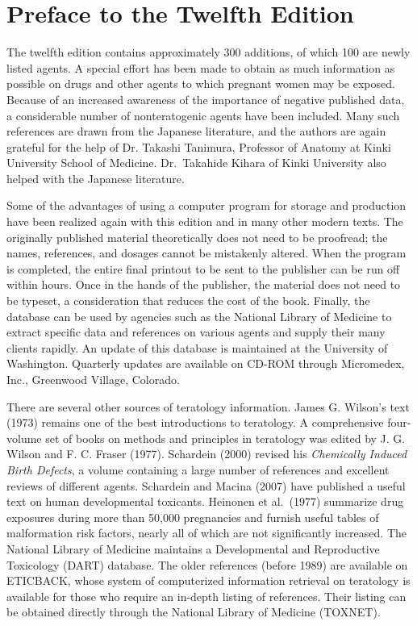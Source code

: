 \clearemptydoublepage
\chapter{Preface to the Twelfth Edition}




The twelfth edition contains approximately 300 additions, of which
100 are newly listed agents.  A special effort has been made to
obtain as much information as possible on drugs and other agents to
which pregnant women may be exposed. Because of an increased
awareness of the importance of negative published data, a
considerable number of nonteratogenic agents have been included.
Many such references are drawn from the Japanese literature, and the
authors are again grateful for the help of Dr. Takashi Tanimura,
Professor of Anatomy at Kinki University School of Medicine. 
Dr.~Takahide Kihara of Kinki University also
helped with the Japanese literature.

Some of the advantages of using a computer program for storage and
production have been realized again with this edition and in many other
modern texts.  The
originally published material theoretically does not need to be
proofread; the names, references, and dosages cannot be mistakenly
altered.  When the program is completed, the entire final printout to
be sent to the publisher can be run off within hours.  Once in the
hands of the publisher, the material does not need to be typeset, a
consideration that reduces the cost of the book. Finally, the
database can be used by agencies such as the National Library of
Medicine to extract specific data and references on various agents
and supply their many clients rapidly.  An  update of this
database is maintained at the University of Washington.  Quarterly
updates are available on CD-ROM through Micromedex, Inc., Greenwood
Village, Colorado.

There are several other sources of teratology information.  James G.
Wilson's text (1973) remains one of the best introductions to
teratology.  A comprehensive four-volume set of books on methods and
principles in teratology was edited by J. G. Wilson and F. C.
Fraser (1977).  Schardein (2000) revised his \textit{Chemically
Induced Birth Defects}, a volume containing a large number of
references and excellent reviews of different agents.  
Schardein and Macina (2007) have published a useful text
on human developmental toxicants.
Heinonen et
al.~(1977) summarize drug exposures during more than 50,000
pregnancies and furnish useful tables of malformation risk factors,
nearly all of which are not significantly increased.  The National
Library of Medicine maintains a Developmental and Reproductive
Toxicology (DART) database.  The older references (before 1989) are
available on ETICBACK, whose system of computerized information
retrieval on teratology is available for those who require an
in-depth listing of references.  Their listing can be obtained
directly through the National Library of Medicine (TOXNET).

